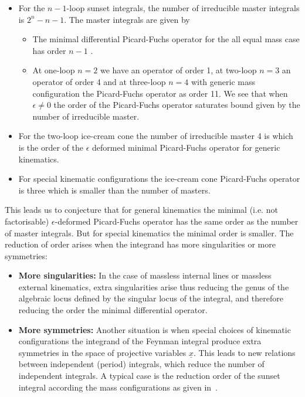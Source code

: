 \documentclass[a4paper,12pt]{article}
\newcommand\lNote[1]{
	\todo[backgroundcolor=red!20!white,fancyline,
	bordercolor=white]{ LDLC:  #1}}
\numberwithin{equation}{section}
\numberwithin{figure}{section}
\begin{document}
\begin{itemize}
	\item  For the $n-1$-loop
	sunset integrals, the number of irreducible master integrals 
	is $2^{n}-n-1$. \lNote{cite?} The \lNote{number of}  master integrals are given by 
%
%	
	\begin{itemize}  \item The minimal differential Picard-Fuchs operator for the all
		equal mass case has order  $n-1$ .
		\item At one-loop $n=2$ we have an operator of order 1, at two-loop
		$n=3$ an operator of order 4 and at three-loop $n=4$ with generic
		mass configuration the Picard-Fuchs operator
		as   order 11.  We see that when $\epsilon\neq0$  the order of the
		Picard-Fuchs operator saturates bound given by the number of
		irreducible master.
	\end{itemize}
	\item For the two-loop ice-cream cone the number of irreducible
	master 4 is which is the order of the $\epsilon$ deformed minimal Picard-Fuchs
	operator for generic kinematics.
        \item For special kinematic configurations  the ice-cream cone
          Picard-Fuchs operator  is three which is smaller than the
          number of masters.
\end{itemize}
This leads us to conjecture that 
 for general kinematics the minimal (i.e. not
factorisable) $\epsilon$-deformed Picard-Fuchs operator has 
the same order
as the number of master integrals. But for special kinematics the minimal
order is smaller.
%
The reduction of order arises when the integrand has more
singularities or more symmetries:
\begin{itemize}
  \item {\bf More singularities:} In the case of
massless internal lines or massless external kinematics, extra
singularities arise thus reducing the genus of the algebraic locus defined
by the singular locus of the integral, and therefore reducing the
order the minimal differential operator. \lNote{confusing}
\item {\bf More symmetries:}
Another situation is when special choices of kinematic
configurations the integrand of the Feynman integral produce extra
symmetries in the space of projective variables $\underline
x$. This leads to new relations between independent (period) integrals, which reduce the number of independent integrals. A typical case is the
reduction order of the sunset integral according the mass
configurations as given in~\cite{Bloch:2014qca,Lairez:2022zkj,Bonisch:2021yfw,Bonisch:2020qmm,Pogel:2022vat}.
\end{itemize}
\end{document}

